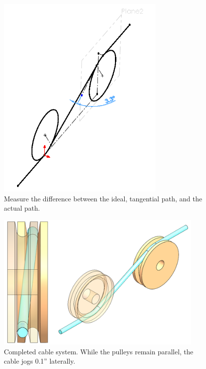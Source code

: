 \begin{figure}[H]
\begin{center}
  \includegraphics[height=4in]{images/figures/measure-fleet-angle.png}
\end{center}
\caption{Measure the difference between the ideal, tangential path, and the actual
path. \label{fig:measure-fleet-angle}}

\end{figure}

\begin{figure}[H]
\begin{center}
  \includegraphics[width=4in]{images/figures/completed-non-tangential.png}
\end{center}
\caption{Completed cable system. While the pulleys remain parallel, the cable jogs
0.1'' laterally. \label{fig:completed-non-tangential}}

\end{figure}


